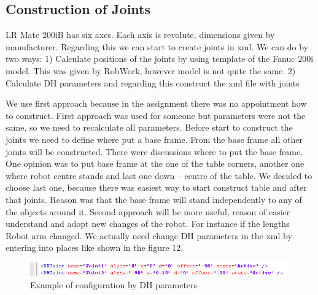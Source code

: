 \subsection{Construction of Joints}
LR Mate 200iB has six axes. Each axis is revolute, dimensions given by manufacturer. Regarding this we can start to create joints in xml. We can do by two ways:
1)	Calculate positions of the joints by using template of the Fanuc 200i model. This was given by RobWork, however model is not quite the same.
2)	Calculate DH parameters and regarding this construct the xml file with joints

We use first approach because in the assignment there was no appointment how to construct. First approach was used for someone but parameters were not the same, so we need to recalculate all parameters. Before start to construct the joints we need to define where put a base frame. From the base frame all other joints will be constructed. There were discussions where to put the base frame. One opinion was to put base frame at the one of the table corners, another one where robot centre stands and last one down – centre of the table. We decided to choose last one, because there was easiest way to start construct table and after that joints. Reason was that the base frame will stand independently to any of the objects around it.
Second approach will be more useful, reason of easier understand and adopt new changes of the robot. For instance if the lengths Robot arm changed. We actually need change DH parameters in the xml by entering into places like shown in the figure 12. 

\begin{figure}[H]
  \centering
  \includegraphics[scale= 0.8]{source/DHParameters.png}
  \caption{Example of configuration by DH parameters}
  \label{fig:DHParameters}
\end{figure}




